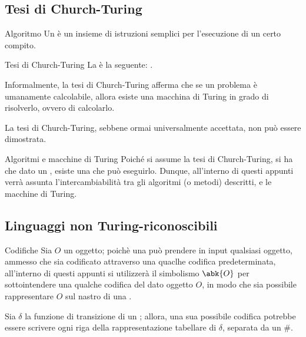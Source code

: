 \documentclass[a4paper, 12pt]{report}
\begin{document}
    \subsection{Tesi di Church-Turing}

    \begin{frameddefn}{Algoritmo}
        Un  è un insieme di istruzioni semplici per l'esecuzione di un certo compito.
    \end{frameddefn}

    \begin{frameddefn}{Tesi di Church-Turing}
        La  è la seguente: .

        Informalmente, la tesi di Church-Turing afferma che se un problema è umanamente calcolabile, allora esiste una macchina di Turing in grado di risolverlo, ovvero di calcolarlo.

        La tesi di Church-Turing, sebbene ormai universalmente accettata, non può essere dimostrata.
    \end{frameddefn}

    \begin{framedobs}[label={alg tm}]{Algoritmi e macchine di Turing}
        Poiché si assume la tesi di Church-Turing, si ha che dato un , esiste una  che può eseguirlo. Dunque, all'interno di questi appunti verrà assunta l'intercambiabilità tra gli algoritmi (o metodi) descritti, e le macchine di Turing.
    \end{framedobs}

    \subsection{Linguaggi non Turing-riconoscibili}
    
    \begin{framedobs}{Codifiche}
        Sia $O$ un oggetto; poichè una \TM può prendere in input qualsiasi oggetto, ammesso che sia codificato attraverso una quaclhe codifica predeterminata, all'interno di questi appunti si utilizzerà il simbolismo $\abk{O}$ per sottointendere una qualche codifica del dato oggetto $O$, in modo che sia possibile rappresentare $O$ sul nastro di una \TM.
    \end{framedobs}

    \begin{example}
        Sia $\delta$ la funzione di transizione di un \DFA; allora, una sua possibile codifica potrebbe essere scrivere ogni riga della rappresentazione tabellare di $\delta$, separata da un \ttt \#.
    \end{example}
\end{document}
